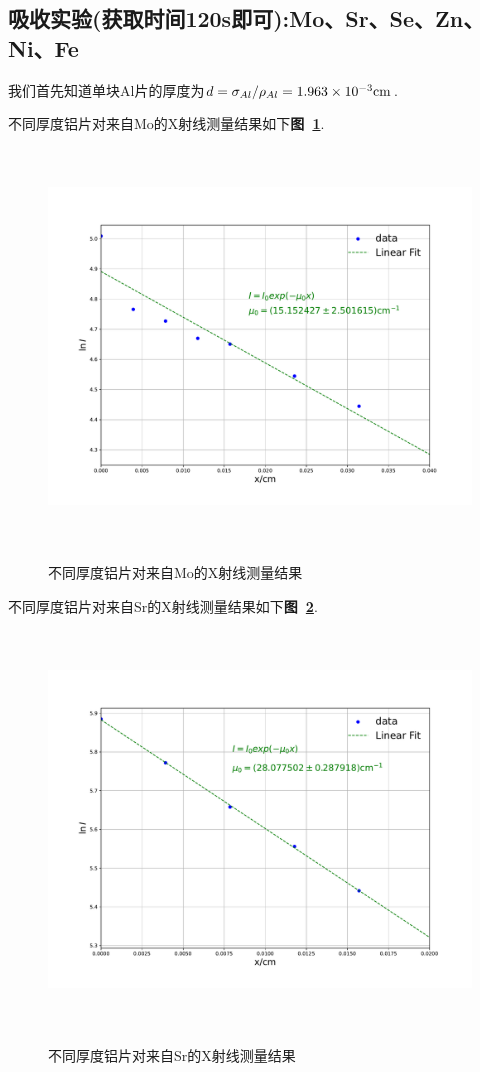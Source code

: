 \documentclass[a4paper]{article}
\begin{document}
\subsection{吸收实验(获取时间120s即可):Mo、Sr、Se、Zn、Ni、Fe}\label{sub2}
我们首先知道单块Al片的厚度为$d=\sigma_{Al}/\rho_{Al}=1.963\times10^{-3}\rm cm$.

不同厚度铝片对来自Mo的X射线测量结果如下\textbf{图~\ref{fig:fig2}}.
\begin{figure}[H]
 \centering
 \caption{不同厚度铝片对来自Mo的X射线测量结果}
 \includegraphics[height=10.5cm, width=14cm]{images/phyex2_fig1.pdf}
 \label{fig:fig2}
\end{figure}
不同厚度铝片对来自Sr的X射线测量结果如下\textbf{图~\ref{fig:fig3}}.
\begin{figure}[H]
 \centering
 \caption{不同厚度铝片对来自Sr的X射线测量结果}
 \includegraphics[height=10.5cm, width=14cm]{images/phyex2_fig2.pdf}
 \label{fig:fig3}
\end{figure}
\end{document}
